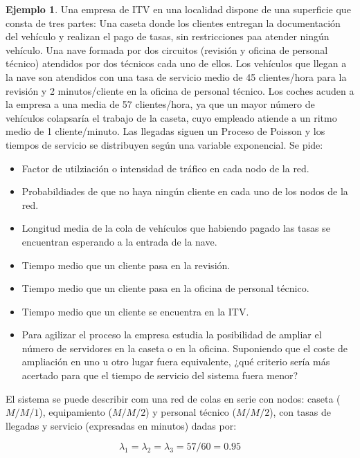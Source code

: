 \documentclass[
]{book}
\providecommand{\tightlist}{%
  \setlength{\itemsep}{0pt}\setlength{\parskip}{0pt}}
\theoremstyle{definition}
\theoremstyle{definition}
\newtheorem{example}{Ejemplo}[chapter]
\theoremstyle{definition}
\theoremstyle{definition}
\theoremstyle{remark}
\begin{document}
\begin{example}

Una empresa de ITV en una localidad dispone de una superficie que consta de tres partes: Una caseta donde los clientes entregan la documentación del vehículo y realizan el pago de tasas, sin restricciones paa atender ningún vehículo. Una nave formada por dos circuitos (revisión y oficina de personal técnico) atendidos por dos técnicos cada uno de ellos. Los vehículos que llegan a la nave son atendidos con una tasa de servicio medio de 45 clientes/hora para la revisión y 2 minutos/cliente en la oficina de personal técnico. Los coches acuden a la empresa a una media de 57 clientes/hora, ya que un mayor número de vehículos colapsaría el trabajo de la caseta, cuyo empleado atiende a un ritmo medio de 1 cliente/minuto. Las llegadas siguen un Proceso de Poisson y los tiempos de servicio se distribuyen según una variable exponencial. Se pide:

\begin{itemize}
\tightlist
\item
  Factor de utilziación o intensidad de tráfico en cada nodo de la red.
\item
  Probabildiades de que no haya ningún cliente en cada uno de los nodos de la red.
\item
  Longitud media de la cola de vehículos que habiendo pagado las tasas se encuentran esperando a la entrada de la nave.
\item
  Tiempo medio que un cliente pasa en la revisión.
\item
  Tiempo medio que un cliente pasa en la oficina de personal técnico.
\item
  Tiempo medio que un cliente se encuentra en la ITV.
\item
  Para agilizar el proceso la empresa estudia la posibilidad de ampliar el número de servidores en la caseta o en la oficina. Suponiendo que el coste de ampliación en uno u otro lugar fuera equivalente, ¿qué criterio sería más acertado para que el tiempo de servicio del sistema fuera menor?
\end{itemize}

\end{example}

El sistema se puede describir com una red de colas en serie con nodos: caseta (\(M/M/1\)), equipamiento (\(M/M/2\)) y personal técnico (\(M/M/2\)), con tasas de llegadas y servicio (expresadas en minutos) dadas por:

\[\lambda_1 = \lambda_2 = \lambda_3 = 57/60 = 0.95\]
\end{document}
